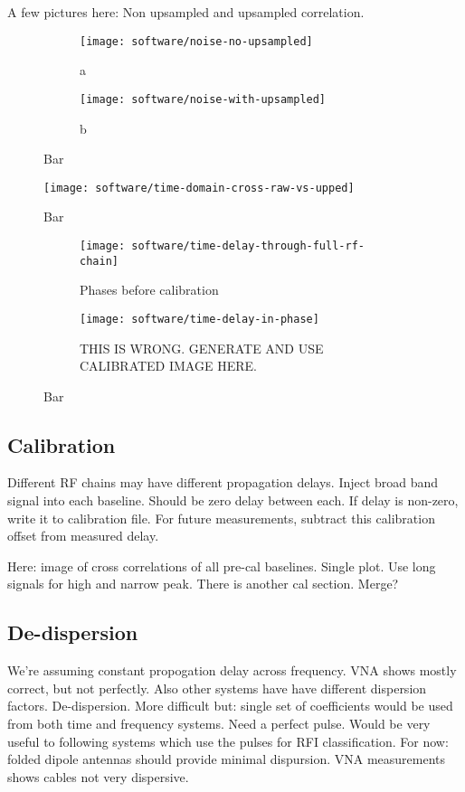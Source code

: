 A few pictures here:
Non upsampled and upsampled correlation.
\begin{figure}
  \centering
  \begin{subfigure}[b]{0.49\textwidth}
    \centering
    \texttt{[image: software/noise-no-upsampled]}
    \caption{a}
  \end{subfigure}
  \begin{subfigure}[b]{0.49\textwidth}
    \centering
    \texttt{[image: software/noise-with-upsampled]}
    \caption{b}
  \end{subfigure}
  \caption{Bar}
\end{figure}

\begin{figure}
  \centering
  \texttt{[image: software/time-domain-cross-raw-vs-upped]}
  \caption{Bar}
  \label{fig:software-aseaweawea}
\end{figure}

\begin{figure}
  \centering
  \begin{subfigure}[b]{0.49\textwidth}
    \centering
    \texttt{[image: software/time-delay-through-full-rf-chain]}
    \caption{Phases before calibration}
  \end{subfigure}
  \begin{subfigure}[b]{0.49\textwidth}
    \centering
    \texttt{[image: software/time-delay-in-phase]}
    \caption{THIS IS WRONG. GENERATE AND USE CALIBRATED IMAGE HERE.}
  \end{subfigure}
  \caption{Bar}
\end{figure}

\subsection{Calibration}
Different RF chains may have different propagation delays. 
Inject broad band signal into each baseline. Should be zero delay between each. 
If delay is non-zero, write it to calibration file.
For future measurements, subtract this calibration offset from measured delay. 

Here: image of cross correlations of all pre-cal baselines. Single plot. Use long signals for high and narrow peak.
There is another cal section. Merge?

\subsection{De-dispersion}
We're assuming constant propogation delay across frequency. VNA shows mostly correct, but not perfectly. Also other systems have have different dispersion factors. 
De-dispersion. 
More difficult but: single set of coefficients would be used from both time and frequency systems. 
Need a perfect pulse.
Would be very useful to following systems which use the pulses for RFI classification. 
For now: folded dipole antennas should provide minimal dispursion. 
VNA measurements shows cables not very dispersive.
